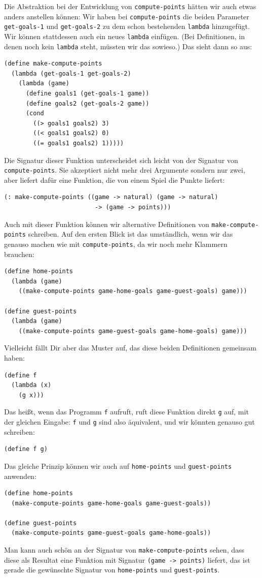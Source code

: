 Die Abstraktion bei der Entwicklung von \lstinline{compute-points}
hätten wir auch etwas anders anstellen können: Wir haben bei
\lstinline{compute-points} die beiden Parameter
\lstinline{get-goals-1} und \lstinline{get-goals-2} zu dem schon
bestehenden \lstinline{lambda} hinzugefügt.  Wir können stattdessen
auch ein neues \lstinline{lambda} einfügen.  (Bei Definitionen, in
denen noch kein \lstinline{lambda} steht, müssten wir das sowieso.)
Das sieht dann so aus:
%
\begin{lstlisting}
(define make-compute-points
  (lambda (get-goals-1 get-goals-2)
    (lambda (game)
      (define goals1 (get-goals-1 game))
      (define goals2 (get-goals-2 game))
      (cond
        ((> goals1 goals2) 3)
        ((< goals1 goals2) 0)
        ((= goals1 goals2) 1)))))
\end{lstlisting}
%
Die Signatur dieser Funktion unterscheidet sich leicht von der
Signatur von \lstinline{compute-points}.  Sie akzeptiert nicht mehr drei
Argumente sondern nur zwei, aber liefert dafür eine Funktion, die von
einem Spiel die Punkte liefert:
%
\begin{lstlisting}
(: make-compute-points ((game -> natural) (game -> natural) 
                         -> (game -> points)))
\end{lstlisting}
%
Auch mit dieser Funktion können wir alternative Definitionen von
\lstinline{make-compute-points} schreiben.  Auf den ersten Blick ist
das umständlich, wenn wir das genauso machen wie mit
\lstinline{compute-points}, da wir noch mehr Klammern brauchen:
%
\begin{lstlisting}
(define home-points
  (lambda (game)
    ((make-compute-points game-home-goals game-guest-goals) game)))

(define guest-points
  (lambda (game)
    ((make-compute-points game-guest-goals game-home-goals) game)))
\end{lstlisting}
%
Vielleicht fällt Dir aber das Muster auf, das diese beiden
Definitionen gemeinsam haben:
%
\begin{lstlisting}
(define f
  (lambda (x)
    (g x)))
\end{lstlisting}
%
Das heißt, wenn das Programm \lstinline{f} aufruft, ruft diese
Funktion direkt \lstinline{g} auf, mit der gleichen Eingabe:
\lstinline{f} und \lstinline{g} sind also äquivalent, und wir könnten
genauso gut schreiben:
%
\begin{lstlisting}
(define f g)
\end{lstlisting}
%
Das gleiche Prinzip können wir auch auf \lstinline{home-points} und
\lstinline{guest-points} anwenden:
%
\begin{lstlisting}
(define home-points
  (make-compute-points game-home-goals game-guest-goals))

(define guest-points
  (make-compute-points game-guest-goals game-home-goals))
\end{lstlisting}
%
Man kann auch schön an der Signatur von
\lstinline{make-compute-points} sehen, dass diese als Resultat eine
Funktion mit Signatur \lstinline{(game -> points)} liefert, das ist
gerade die gewünschte Signatur von \lstinline{home-points} und
\lstinline{guest-points}.

